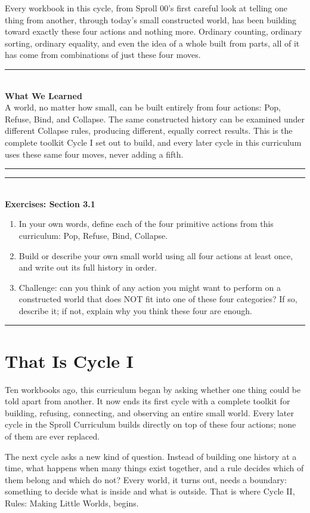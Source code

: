 \documentclass[11pt]{book}
\newenvironment{exercisebox}[1]{\vspace{0.8em}\noindent\rule{\linewidth}{0.6pt}\\[0.2em]\textbf{Exercises: #1}\\[0.3em]\begin{enumerate}[label=\arabic*., itemsep=0.4em]}{\end{enumerate}\noindent\rule{\linewidth}{0.6pt}\vspace{0.6em}}
\newenvironment{summarybox}{\vspace{0.6em}\noindent\rule{\linewidth}{0.6pt}\\[0.2em]\textbf{What We Learned}\\[0.3em]}{\\[0.2em]\noindent\rule{\linewidth}{0.6pt}\vspace{0.6em}}
\begin{document}
Every workbook in this cycle, from Sproll 00's first careful look at telling one thing from another, through today's small constructed world, has been building toward exactly these four actions and nothing more. Ordinary counting, ordinary sorting, ordinary equality, and even the idea of a whole built from parts, all of it has come from combinations of just these four moves.

\begin{summarybox}
A world, no matter how small, can be built entirely from four actions: Pop, Refuse, Bind, and Collapse. The same constructed history can be examined under different Collapse rules, producing different, equally correct results. This is the complete toolkit Cycle I set out to build, and every later cycle in this curriculum uses these same four moves, never adding a fifth.
\end{summarybox}

\begin{exercisebox}{Section 3.1}
\item In your own words, define each of the four primitive actions from this curriculum: Pop, Refuse, Bind, Collapse.
\item Build or describe your own small world using all four actions at least once, and write out its full history in order.
\item Challenge: can you think of any action you might want to perform on a constructed world that does NOT fit into one of these four categories? If so, describe it; if not, explain why you think these four are enough.
\end{exercisebox}

\chapter*{That Is Cycle I}

Ten workbooks ago, this curriculum began by asking whether one thing could be told apart from another. It now ends its first cycle with a complete toolkit for building, refusing, connecting, and observing an entire small world. Every later cycle in the Sproll Curriculum builds directly on top of these four actions; none of them are ever replaced.

The next cycle asks a new kind of question. Instead of building one history at a time, what happens when many things exist together, and a rule decides which of them belong and which do not? Every world, it turns out, needs a boundary: something to decide what is inside and what is outside. That is where Cycle II, Rules: Making Little Worlds, begins.
\end{document}

